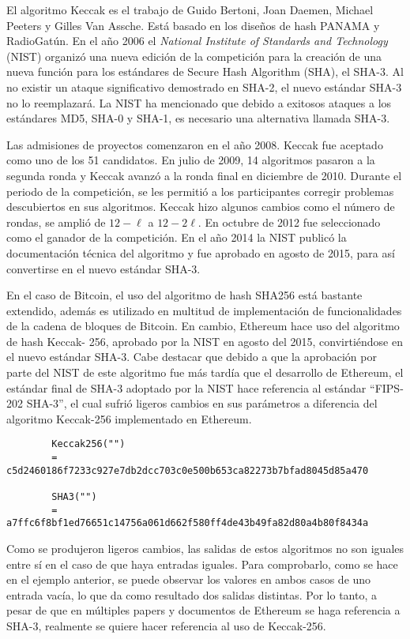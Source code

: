       El algoritmo Keccak es el trabajo de Guido Bertoni, Joan Daemen, Michael Peeters y Gilles Van Assche. Está basado en los diseños de 
      hash PANAMA y RadioGatún. En el año 2006 el \textit{National Institute of Standards and Technology} (NIST) organizó una nueva edición de la competición para la creación de una nueva función 
      para los estándares de Secure Hash Algorithm (SHA), el SHA-3. Al no existir un ataque significativo demostrado en SHA-2, el nuevo 
      estándar SHA-3 no lo reemplazará. La NIST ha mencionado que debido a exitosos ataques a los estándares MD5, SHA-0 y SHA-1, es 
      necesario una alternativa llamada SHA-3. \parencite{stevens2017}

      Las admisiones de proyectos comenzaron en el año 2008. Keccak fue aceptado como uno de los 51 candidatos. En julio de 2009, 14 
      algoritmos pasaron a la segunda ronda y Keccak avanzó a la ronda final en diciembre de 2010. Durante el periodo de la competición, se 
      les permitió a los participantes corregir problemas descubiertos en sus algoritmos. Keccak hizo algunos cambios como el número de 
      rondas, se amplió de ${\displaystyle 12-\ell}$ a ${\displaystyle 12-2\ell }$. En 
      octubre de 2012 fue seleccionado como el ganador de la competición. En el año 2014 la NIST publicó la documentación técnica del 
      algoritmo y fue aprobado en agosto de 2015, para así convertirse en el nuevo estándar SHA-3. \parencite{nist2015}

      En el caso de Bitcoin, el uso del algoritmo de hash SHA256 está bastante extendido,
      además es utilizado en multitud de implementación de funcionalidades de la cadena
      de bloques de Bitcoin. En cambio, Ethereum hace uso del algoritmo de hash Keccak-
      256, aprobado por la NIST en agosto del 2015, convirtiéndose en el nuevo estándar
      SHA-3.
      Cabe destacar que debido a que la aprobación por parte del NIST de este algoritmo fue más tardía que el desarrollo de Ethereum, el 
      estándar final de SHA-3 adoptado por
      la NIST hace referencia al estándar “FIPS-202 SHA-3”, el cual sufrió ligeros cambios
      en sus parámetros a diferencia del algoritmo Keccak-256 implementado en Ethereum.

      \begin{verbatim}
        Keccak256("")
        = c5d2460186f7233c927e7db2dcc703c0e500b653ca82273b7bfad8045d85a470

        SHA3("")
        = a7ffc6f8bf1ed76651c14756a061d662f580ff4de43b49fa82d80a4b80f8434a
      \end{verbatim}

      Como se produjeron ligeros cambios, las salidas de estos algoritmos no son iguales
      entre sí en el caso de que haya entradas iguales. Para comprobarlo, como se hace en
      el ejemplo anterior, se puede observar los valores en ambos casos de uno entrada vacía, lo
      que da como resultado dos salidas distintas. Por lo tanto, a pesar de que en múltiples
      papers y documentos de Ethereum se haga referencia a SHA-3, realmente se quiere
      hacer referencia al uso de Keccak-256. \parencite{taibo2022}

